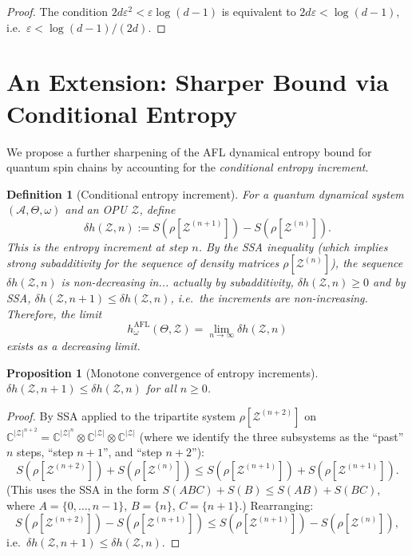 \documentclass[12pt,a4paper]{article}
\newtheorem{proposition}[theorem]{Proposition}
\newtheorem{definition}[theorem]{Definition}
\newcommand{\A}{\mathcal{A}}
\begin{document}
\begin{proof}
The condition $2d\varepsilon^2 < \varepsilon\log(d-1)$ is equivalent to
$2d\varepsilon < \log(d-1)$, i.e.\ $\varepsilon < \log(d-1)/(2d)$.
\end{proof}

\section{An Extension: Sharper Bound via Conditional Entropy}

We propose a further sharpening of the AFL dynamical entropy bound for quantum spin
chains by accounting for the \emph{conditional entropy increment}.

\begin{definition}[Conditional entropy increment]
For a quantum dynamical system $(\A,\Theta,\omega)$ and an OPU $\mathcal{Z}$,
define
\[
  \delta h(\mathcal{Z},n)
  := S\!\left(\rho[\mathcal{Z}^{(n+1)}]\right)
   - S\!\left(\rho[\mathcal{Z}^{(n)}]\right).
\]
This is the entropy increment at step $n$.  By the SSA inequality (which
implies strong subadditivity for the sequence of density matrices
$\rho[\mathcal{Z}^{(n)}]$), the sequence $\delta h(\mathcal{Z},n)$ is
\emph{non-decreasing} in... actually by subadditivity,
$\delta h(\mathcal{Z},n)\geq 0$ and by SSA,
$\delta h(\mathcal{Z},n+1)\leq\delta h(\mathcal{Z},n)$, i.e.\ the increments
are \emph{non-increasing}.  Therefore, the limit
\[
  h_\omega^{\mathrm{AFL}}(\Theta,\mathcal{Z})
  = \lim_{n\to\infty}\delta h(\mathcal{Z},n)
\]
exists as a decreasing limit.
\end{definition}

\begin{proposition}[Monotone convergence of entropy increments]
\label{prop:mono}
$\delta h(\mathcal{Z},n+1)\leq\delta h(\mathcal{Z},n)$ for all $n\geq 0$.
\end{proposition}
\begin{proof}
By SSA applied to the tripartite system
$\rho[\mathcal{Z}^{(n+2)}]$ on
$\mathbb{C}^{|\mathcal{Z}|^{n+2}}
= \mathbb{C}^{|\mathcal{Z}|^n}\otimes\mathbb{C}^{|\mathcal{Z}|}\otimes\mathbb{C}^{|\mathcal{Z}|}$
(where we identify the three subsystems as the ``past'' $n$ steps,
``step $n+1$'', and ``step $n+2$''):
\[
  S(\rho[\mathcal{Z}^{(n+2)}])
  + S(\rho[\mathcal{Z}^{(n)}])
  \leq S(\rho[\mathcal{Z}^{(n+1)}]) + S(\rho[\mathcal{Z}^{(n+1)}]).
\]
(This uses the SSA in the form $S(ABC)+S(B)\leq S(AB)+S(BC)$, where
$A=\{0,\ldots,n-1\}$, $B=\{n\}$, $C=\{n+1\}$.)  Rearranging:
\[
  S(\rho[\mathcal{Z}^{(n+2)}]) - S(\rho[\mathcal{Z}^{(n+1)}])
  \leq S(\rho[\mathcal{Z}^{(n+1)}]) - S(\rho[\mathcal{Z}^{(n)}]),
\]
i.e.\ $\delta h(\mathcal{Z},n+1)\leq\delta h(\mathcal{Z},n)$.
\end{proof}
\end{document}
